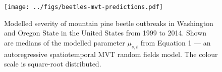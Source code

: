 \documentclass[12pt,english]{article}
\begin{document}
\begin{spacing}{1.8}
\clearpage

\begin{figure}[htb]
  \begin{center}
    \texttt{[image: ../figs/beetles-mvt-predictions.pdf]}
    \caption{Modelled severity of mountain pine beetle outbreaks in Washington and
      Oregon State in the United States from 1999 to 2014.
      Shown are medians of the modelled parameter $\mu_{s,t}$ from Equation 1
      --- an autoregressive spatiotemporal MVT random fields model.
      The colour scale is square-root distributed.
    }
    \label{fig:beetle-pred}
  \end{center}
\end{figure}


\end{spacing}
\end{document}
